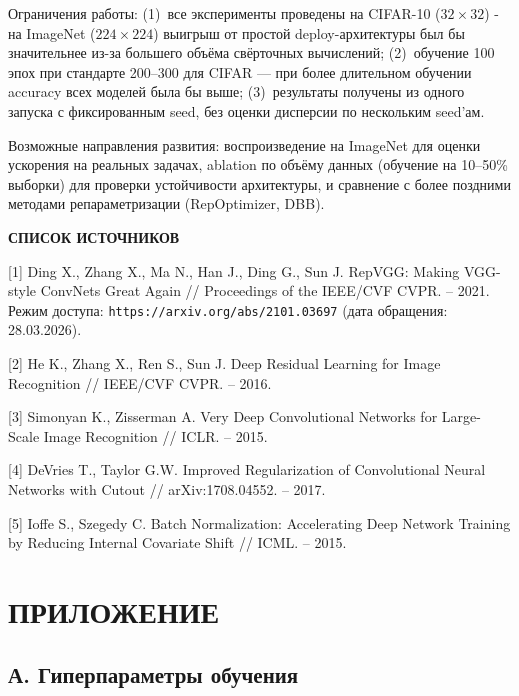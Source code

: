 \documentclass[12pt,a4paper]{article}
\begin{document}
Ограничения работы: (1)~все эксперименты проведены на CIFAR-10 ($32\times32$) - на ImageNet ($224\times224$) выигрыш от простой deploy-архитектуры был бы значительнее из-за большего объёма свёрточных вычислений; (2)~обучение 100 эпох при стандарте 200--300 для CIFAR --- при более длительном обучении accuracy всех моделей была бы выше; (3)~результаты получены из одного запуска с фиксированным seed, без оценки дисперсии по нескольким seed'ам.

Возможные направления развития: воспроизведение на ImageNet для оценки ускорения на реальных задачах, ablation по объёму данных (обучение на 10--50\% выборки) для проверки устойчивости архитектуры, и сравнение с более поздними методами репараметризации (RepOptimizer, DBB).


\clearpage
\begin{center}
\textbf{СПИСОК ИСТОЧНИКОВ}
\end{center}

\begingroup
\setlength{\parindent}{0pt}
\setlength{\parskip}{1.2em}

[1] Ding X., Zhang X., Ma N., Han J., Ding G., Sun J. RepVGG: Making VGG-style ConvNets Great Again // Proceedings of the IEEE/CVF CVPR. -- 2021.
Режим доступа: \texttt{https://arxiv.org/abs/2101.03697} (дата обращения: 28.03.2026).

[2] He K., Zhang X., Ren S., Sun J. Deep Residual Learning for Image Recognition // IEEE/CVF CVPR. -- 2016.

[3] Simonyan K., Zisserman A. Very Deep Convolutional Networks for Large-Scale Image Recognition // ICLR. -- 2015.

[4] DeVries T., Taylor G.W. Improved Regularization of Convolutional Neural Networks with Cutout // arXiv:1708.04552. -- 2017.

[5] Ioffe S., Szegedy C. Batch Normalization: Accelerating Deep Network Training by Reducing Internal Covariate Shift // ICML. -- 2015.

\endgroup

\clearpage

\appendix
\section*{ПРИЛОЖЕНИЕ}

\subsection*{А. Гиперпараметры обучения}
\end{document}

